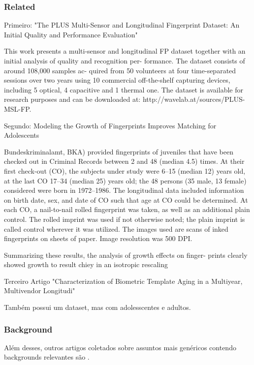 \documentclass[12pt,a4paper]{article}
\begin{document}
\subsubsection{Related}

Primeiro: "The PLUS Multi-Sensor and Longitudinal
Fingerprint Dataset: An Initial Quality and
Performance Evaluation"

This work presents a multi-sensor and longitudinal FP dataset
together with an initial analysis of quality and recognition per-
formance. The dataset consists of around 108,000 samples ac-
quired from 50 volunteers at four time-separated sessions over
two years using 10 commercial off-the-shelf capturing devices,
including 5 optical, 4 capacitive and 1 thermal one. The dataset
is available for research purposes and can be downloaded at:
http://wavelab.at/sources/PLUS-MSL-FP.

Segundo:
Modeling the Growth of Fingerprints Improves
Matching for Adolescents

Bundeskriminalamt, BKA) provided fingerprints of juveniles that
have been checked out in Criminal Records between 2 and 48 (median
4.5) times. At their first check-out (CO), the subjects under study
were 6–15 (median 12) years old, at the last CO 17–34 (median 25)
years old; the 48 persons (35 male, 13 female) considered were born
in 1972–1986. The longitudinal data included information on birth
date, sex, and date of CO such that age at CO could be determined.
At each CO, a nail-to-nail rolled fingerprint was taken, as well as an
additional plain control. The rolled imprint was used if not otherwise
noted; the plain imprint is called control wherever it was utilized. The
images used are scans of inked fingerprints on sheets of paper. Image
resolution was 500 DPI.

Summarizing these results, the analysis of growth effects on finger-
prints clearly showed growth to result chiey in an isotropic rescaling


Terceiro Artigo "Characterization of Biometric Template Aging
in a Multiyear, Multivendor Longitudi"

Também possui um dataset, mas com adolesscentes e adultos.

\subsubsection{Background}
Além desses, outros artigos coletados sobre assuntos mais genéricos contendo backgrounds relevantes são \cite{handbook-biometrics, two, three, four, five}.
\end{document}
